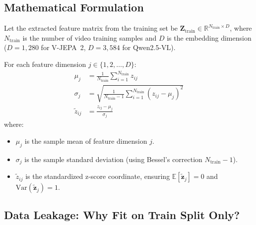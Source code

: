 \documentclass[11pt, a4paper]{article}
\begin{document}
\subsection{Mathematical Formulation}

Let the extracted feature matrix from the training set be $\mathbf{Z}_{\text{train}} \in \mathbb{R}^{N_{\text{train}} \times D}$, where $N_{\text{train}}$ is the number of video training samples and $D$ is the embedding dimension ($D=1{,}280$ for V-JEPA~2, $D=3{,}584$ for Qwen2.5-VL).

\begin{eqbox}
For each feature dimension $j \in \{1, 2, \ldots, D\}$:
\begin{align}
\mu_j &= \frac{1}{N_{\text{train}}} \sum_{i=1}^{N_{\text{train}}} z_{ij} \\[0.5em]
\sigma_j &= \sqrt{\frac{1}{N_{\text{train}} - 1} \sum_{i=1}^{N_{\text{train}}} (z_{ij} - \mu_j)^2} \\[0.5em]
\tilde{z}_{ij} &= \frac{z_{ij} - \mu_j}{\sigma_j}
\end{align}
where:
\begin{itemize}[leftmargin=1.2em]
    \item $\mu_j$ is the sample mean of feature dimension $j$.
    \item $\sigma_j$ is the sample standard deviation (using Bessel's correction $N_{\text{train}}-1$).
    \item $\tilde{z}_{ij}$ is the standardized z-score coordinate, ensuring $\mathbb{E}[\tilde{\mathbf{z}}_j] = 0$ and $\text{Var}(\tilde{\mathbf{z}}_j) = 1$.
\end{itemize}
\end{eqbox}

\subsection{Data Leakage: Why Fit on Train Split Only?}
\end{document}
